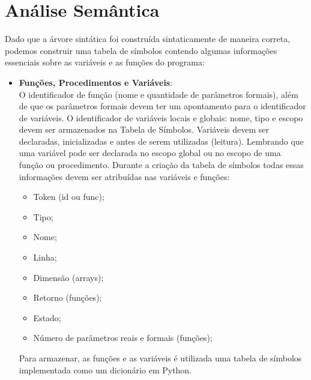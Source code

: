 \documentclass[12pt]{article}
\begin{document}
\section{Análise Semântica}  
Dado que a árvore sintática foi construída sintaticamente de maneira correta, podemos construir uma tabela de símbolos contendo algumas informações essenciais sobre as variáveis e as funções do programa: 

\begin{itemize}
	\item \textbf{Funções, Procedimentos e Variáveis}:\\ O identificador de função (nome e quantidade de
	parâmetros formais), além de que os parâmetros formais devem ter um apontamento
	para o identificador de variáveis. 
	O identificador de variáveis locais e globais: nome, tipo e escopo
	devem ser armazenados na Tabela de Símbolos. Variáveis devem ser declaradas,
	inicializadas e antes de serem utilizadas (leitura). Lembrando que uma variável pode
	ser declarada no escopo global ou no escopo de uma função ou procedimento. Durante a criação da tabela de símbolos todas essas informações devem ser atribuídas nas variáveis e funções: 
	\begin{itemize}
		\item Token (id ou func); 
		\item Tipo; 
		\item Nome; 
		\item Linha; 
		\item Dimensão (arrays); 
		\item Retorno (funções); 
		\item Estado; 
		\item Número de parâmetros reais e formais (funções);
	\end{itemize}
Para armazenar, as funções e as variáveis é utilizada uma tabela de símbolos implementada como um dicionário em Python. 

\end{itemize} 
\end{document}
